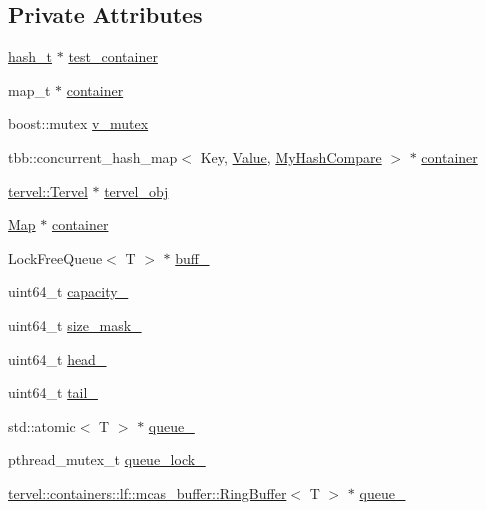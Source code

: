 \subsection*{Private Attributes}
\begin{DoxyCompactItemize}
\item 
\hyperlink{class_test_class_acff06dce1120b0a2879c55f7a5e5acc7}{hash\+\_\+t} $\ast$ \hyperlink{class_test_class_a94c73b5cb829bdd7e729be5668f6f6da}{test\+\_\+container}
\item 
map\+\_\+t $\ast$ \hyperlink{class_test_class_a82e6fb0f71bfaeab7623660b1c6d5801}{container}
\item 
boost\+::mutex \hyperlink{class_test_class_ac56bdd8296cec194c437ae49b63d8887}{v\+\_\+mutex}
\item 
tbb\+::concurrent\+\_\+hash\+\_\+map$<$ Key, \hyperlink{hash__map_2test_object_8h_ad777bf08d8e2b01df17ba5e3c51ae11f}{Value}, \hyperlink{struct_test_class_1_1_my_hash_compare}{My\+Hash\+Compare} $>$ $\ast$ \hyperlink{class_test_class_a45c01f347cfca94da55b3f8f626e4a01}{container}
\item 
\hyperlink{classtervel_1_1_tervel}{tervel\+::\+Tervel} $\ast$ \hyperlink{class_test_class_a73eaea6b839e2a3171945d0f2d209b98}{tervel\+\_\+obj}
\item 
\hyperlink{class_test_class_a1b85c62e95a514dec1b9680e76348329}{Map} $\ast$ \hyperlink{class_test_class_afd26cf553caeb881f2d24252b973a398}{container}
\item 
Lock\+Free\+Queue$<$ T $>$ $\ast$ \hyperlink{class_test_class_aa4ccae17f7befca71214f40ddcca6c1a}{buff\+\_\+}
\item 
uint64\+\_\+t \hyperlink{class_test_class_a011461808ec9d3cfc6f085642fcfec01}{capacity\+\_\+}
\item 
uint64\+\_\+t \hyperlink{class_test_class_af2429ac335c40b2244dcf1c0d27aa3e7}{size\+\_\+mask\+\_\+}
\item 
uint64\+\_\+t \hyperlink{class_test_class_af57483e6863d4fbbe455be1a32514b92}{head\+\_\+}
\item 
uint64\+\_\+t \hyperlink{class_test_class_a4d2c82c8499f514936f1262c684075aa}{tail\+\_\+}
\item 
std\+::atomic$<$ T $>$ $\ast$ \hyperlink{class_test_class_a25fdd248a90a1027d4f9dec63f7b2328}{queue\+\_\+}
\item 
pthread\+\_\+mutex\+\_\+t \hyperlink{class_test_class_aed0b5ac583a2f0c4405ea66e5e4835c6}{queue\+\_\+lock\+\_\+}
\item 
\hyperlink{classtervel_1_1containers_1_1lf_1_1mcas__buffer_1_1_ring_buffer}{tervel\+::containers\+::lf\+::mcas\+\_\+buffer\+::\+Ring\+Buffer}$<$ T $>$ $\ast$ \hyperlink{class_test_class_a58c609d2496e3e96bf13fa26d9697c6c}{queue\+\_\+}

\end{DoxyCompactItemize}
